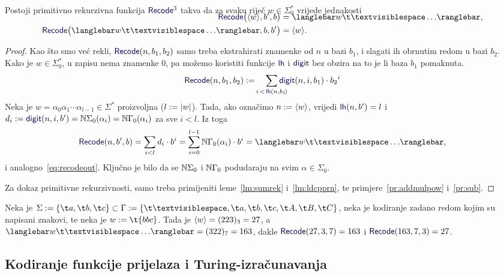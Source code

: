 \begin{lema}\label{lm:recodeprn}
Postoji primitivno rekurzivna funkcija $\f{Recode}^3$ takva da za svaku riječ $w\in\Sigma_0^*$ vrijede jednakosti
\begin{align}
\SwapAboveDisplaySkip
    \label{eq:recodein}\f{Recode}\bigl(\kr w,b',b\bigr)&=\knk{w\bl\ldots}\text,\\
    \label{eq:recodeout}\f{Recode}\bigl(\knk{w\bl\ldots},b,b'\bigr)&=\kr w\text.
\end{align}
\end{lema}
\begin{proof}
Kao što smo već rekli, $\f{Recode}(n,b_1,b_2)$ samo treba ekstrahirati znamenke od $n$ u bazi $b_1$, i slagati ih obrnutim redom u bazi $b_2$. Kako je $w\in\Sigma_0^*$, u zapisu nema znamenke $0$, pa 
možemo koristiti funkcije $\f{lh}$ i $\f{digit}$ bez obzira na to je li baza $b_1$ pomaknuta.
\begin{equation}
    \f{Recode}(n,b_1,b_2):=\quad\sum_{\mathclap{i\,<\,\f{lh}(n,b_1\!)}}\f{digit}(n,i,b_1)\cdot{b_2}^i
\end{equation}
Neka je $w=\alpha_0\alpha_1\dotsm\alpha_{l-1}\in\Sigma^*$ proizvoljna ($l:=\lvert w\rvert$). Tada, ako označimo $n:=\langle w\rangle$, vrijedi $\f{lh}(n,b')=l$ i $d_i:=\f{digit}(n,i,b')=\N\Sigma_0(\alpha_i)=\N\Gamma_0(\alpha_i)$ za sve $i<l$. Iz toga
\begin{equation}
    \f{Recode}(n,b',b)=\sum_{i<l}d_i\cdot b^i=\sum_{i=0}^{l-1}\N\Gamma_0(\alpha_i)\cdot b^i=\knk{w\bl\ldots}\text,
\end{equation}
i analogno~\eqref{eq:recodeout}. Ključno je bilo da se ${\mathbb N}\Sigma_0$ i ${\mathbb N}\Gamma_0$ podudaraju na svim $\alpha\in\Sigma_0$.

Za dokaz primitivne rekurzivnosti, samo treba primijeniti leme~\ref{lm:sumrek} i~\ref{lm:ldcpprn}, te primjere~\ref{pr:addmulpow} i~\ref{pr:sub}.
\end{proof}

\begin{primjer}
Neka je $\Sigma:=\{\t a,\t b,\t c\}\subset\Gamma:=\{\bl,\t a,\t b,\t c,\t A,\t B,\t C\}$, neka je kodiranje zadano redom kojim su napisani znakovi, te neka je $w:=\t{bbc}$. Tada je $\langle w\rangle=(223)_3=27$, a $\knk{w\bl\ldots}=(322)_7=163$, dakle $\f{Recode}(27,3,7)=163$ i $\f{Recode}(163,7,3)=27$.
\end{primjer}

\subsection{Kodiranje funkcije prijelaza i Turing-izračunavanja}

